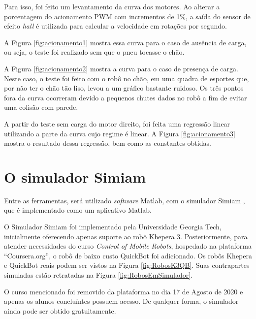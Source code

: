 	Para isso, foi feito um levantamento da curva dos motores. Ao alterar a porcentagem do
	acionamento PWM com incrementos de 1\%, a saída do sensor de efeito \textit{hall} é 
	utilizada para calcular a velocidade em rotações por segundo. 
	
	A Figura \ref{fig:acionamento1} mostra essa curva para o caso de ausência de carga, ou
	seja, o teste foi realizado sem que o pneu tocasse o chão. 
	
	
	
	A Figura \ref{fig:acionamento2} mostra a curva para o caso de presença de carga. Neste
	caso, o teste foi feito com o robô no chão, em uma quadra de esportes que, por não ter 
	o chão tão liso, levou a um gráfico bastante ruidoso. Os três pontos fora da curva 
	ocorreram devido a pequenos chutes dados no robô a fim de evitar uma colisão com parede.
	
	
	
	A partir do teste sem carga do motor direito, foi feita uma regressão linear utilizando 
	a parte da curva cujo regime é linear. A Figura \ref{fig:acionamento3} mostra o resultado 
	dessa regressão, bem como as constantes obtidas.
	
	

\section{O simulador Simiam}

Entre as ferramentas, será utilizado \textit{software} Matlab, com o
simulador Simiam \cite{Simiam}, que é implementado como um aplicativo Matlab.

O Simulador Simiam foi implementado pela Universidade Georgia Tech, 
inicialmente oferecendo apenas suporte ao robô Khepera 3. Posteriormente, 
para atender necessidades do curso \textit{Control of Mobile Robots}, hospedado 
na plataforma ``Coursera.org'', o robô de baixo custo QuickBot foi adicionado. 
Os robôs Khepera e QuickBot reais podem ser vistos na Figura \ref{fig:RobosK3QB}. 
Suas contrapartes simuladas estão retratadas na Figura \ref{fig:RobosEmSimulador}.

O curso mencionado foi removido da plataforma no dia 17 de Agosto de 2020 e apenas
os alunos concluíntes possuem acesso. De qualquer forma, o simulador ainda pode ser
obtido gratuitamente.





